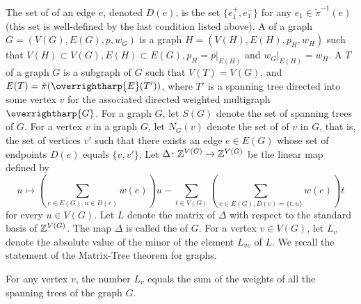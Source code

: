 The set of {} of an edge $e$, denoted $D(e)$, is the set $\{e_1^+,e_1^-\}$ for any $e_1 \in \tilde{\pi}^{-1}(e)$ (this set is well-defined by the last condition listed above). A {} of a graph $G = (V(G),E(G),p,w_G)$ is a graph $H = (V(H),E(H),p_H,w_H)$ such that $V(H) \subset V(G), E(H) \subset E(G), p_H = p|_{E(H)}$ and $w_G|_{E(H)} = w_H$. A {} $T$ of a graph $G$ is a subgraph of $G$ such that $V(T) = V(G)$, and $E(T) = \tilde{\pi}(\overrightharp{E}(T'))$, where $T'$ is a spanning tree directed into some vertex $v$ for the associated directed weighted multigraph $\overrightharp{G}$. For a graph $G$, let $S(G)$ denote the set of spanning trees of $G$. For a vertex $v$ in a graph $G$, let $N_G(v)$ denote the set of {} of $v$ in $G$, that is, the set of vertices $v'$ such that there exists an edge $e \in E(G)$ whose set of endpoints $D(e)$ equals $\{v,v'\}$. Let $\Delta \colon \mathbb Z^{V(G)} \rightarrow \mathbb Z^{V(G)}$ be the linear map defined by 
\[u \mapsto (\sum_{e \in E(G), u \in D(e)} w(e))u - \sum_{t \in V(G)}(\sum_{e \in E(G), D(e) = \{t,u\}} w(e)) t \]
for every $u \in V(G)$. Let $L$ denote the matrix of $\Delta$ with respect to the standard basis of $\mathbb Z^{V(G)}$. The map $\Delta$ is called the {} of $G$. For a vertex $v \in V(G)$, let $L_v$ denote the absolute value of the minor of the element $L_{vv}$ of $L$. We recall the statement of the Matrix-Tree theorem for graphs.
\begin{thm}\label{matrixtreeforgraphs}\cite[Theorem~1]{cs}
 For any vertex $v$, the number $L_v$ equals the sum of the weights of all the spanning trees of the graph $G$.
\end{thm}

